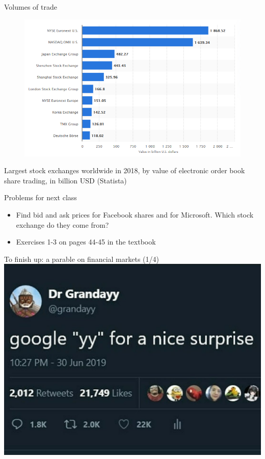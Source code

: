 \documentclass[english,10pt]{beamer}
\theoremstyle{definition}
\begin{document}
\begin{frame}{Volumes of trade}
\begin{figure}
	\includegraphics[width=.75\paperwidth]{pics/volumes2018}
\end{figure}
Largest stock exchanges worldwide in 2018, by value of electronic order book share trading, in billion USD (Statista)
\end{frame}


\begin{frame}{Problems for next class}
\begin{itemize}
	\item Find bid and ask prices for Facebook shares and for Microsoft. Which stock exchange do they come from? 
	\item Exercises 1-3 on pages 44-45 in the textbook
\end{itemize}
\end{frame}


\begin{frame}{To finish up: a parable on financial markets (1/4)}
	\centering \includegraphics[width=0.6\paperwidth]{pics/yy1}
\end{frame}
\end{document}
